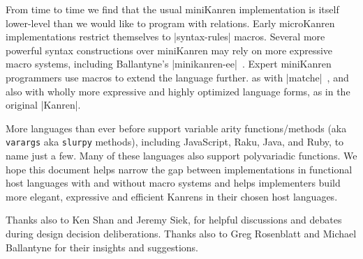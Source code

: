 \documentclass[sigplan,screen,draft,anonymous,review,natbib=false]{acmart}
\begin{document}
From time to time we find that the usual miniKanren implementation is
itself lower-level than we would like to program with relations. Early
microKanren implementations restrict themselves to
\rackinline|syntax-rules| macros. Several more powerful syntax
constructions over miniKanren may rely on more expressive macro
systems, including Ballantyne's
\rackinline|minikanren-ee|~\cite{ballantyne2020macros}. Expert
miniKanren programmers use macros to extend the language further. as
with \rackinline|matche|~\cite{keep2009pattern}, and also with wholly
more expressive and highly optimized language forms, as in the
original \rackinline|Kanren|.

More languages than ever before support variable arity
functions/methods (aka \verb|varargs| aka \verb|slurpy| methods),
including JavaScript, Raku, Java, and Ruby, to name just a few. Many
of these languages also support polyvariadic functions. We hope this
document helps narrow the gap between implementations in functional
host languages with and without macro systems and helps implementers
build more elegant, expressive and efficient Kanrens in their chosen
host languages.

\begin{acks}

  Thanks also to Ken Shan and Jeremy Siek, for helpful discussions and
  debates during design decision deliberations. Thanks also to Greg
  Rosenblatt and Michael Ballantyne for their insights and
  suggestions.

\end{acks}

\printbibliography{}
\end{document}
